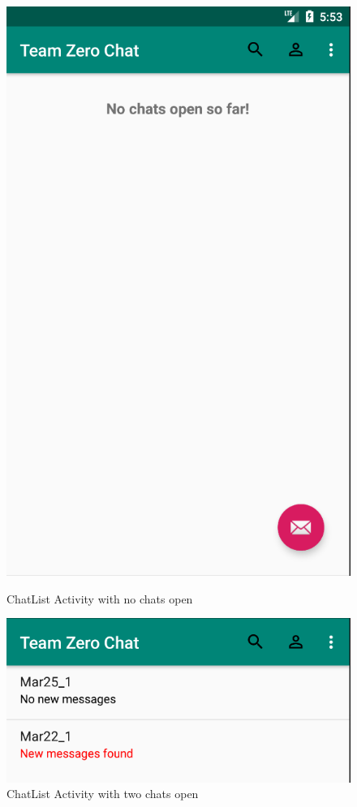 \begin{figure}[H]
\centering
\begin{minipage}{.5\textwidth}
  \centering
  \includegraphics[width=.6\linewidth]{images/ChatList.png}
  \caption{ChatList Activity with no chats open}
  \label{chatListNoMessages}
\end{minipage}%
\begin{minipage}{.5\textwidth}
  \centering
  \includegraphics[width=.8\linewidth]{images/ChatListMessages.png}
  \caption{ChatList Activity with two chats open}
  \label{chatListWithMessages}
\end{minipage}
\end{figure}


